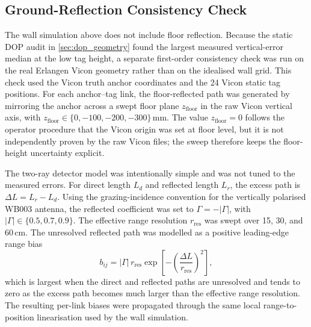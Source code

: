 \documentclass[11pt,a4paper]{article}
\begin{document}
\subsection{Ground-Reflection Consistency Check}
\label{sec:ground_reflection_check}

The wall simulation above does not include floor reflection.
Because the static DOP audit in \cref{sec:dop_geometry} found the largest measured vertical-error median at the low tag height, a separate first-order consistency check was run on the real Erlangen Vicon geometry rather than on the idealised wall grid.
This check used the Vicon truth anchor coordinates and the 24 Vicon static tag positions.
For each anchor--tag link, the floor-reflected path was generated by mirroring the anchor across a swept floor plane $z_{\mathrm{floor}}$ in the raw Vicon vertical axis, with $z_{\mathrm{floor}}\in\{0,-100,-200,-300\}$\,mm.
The value $z_{\mathrm{floor}}=0$ follows the operator procedure that the Vicon origin was set at floor level, but it is not independently proven by the raw Vicon files; the sweep therefore keeps the floor-height uncertainty explicit.

The two-ray detector model was intentionally simple and was not tuned to the measured errors.
For direct length $L_d$ and reflected length $L_r$, the excess path is $\Delta L=L_r-L_d$.
Using the grazing-incidence convention for the vertically polarised WB003 antenna, the reflected coefficient was set to $\Gamma=-|\Gamma|$, with $|\Gamma|\in\{0.5,0.7,0.9\}$.
The effective range resolution $r_{\mathrm{res}}$ was swept over 15, 30, and 60\,cm.
The unresolved reflected path was modelled as a positive leading-edge range bias
\[
  b_{ij}=|\Gamma|\,r_{\mathrm{res}}
  \exp\!\left[-\left(\frac{\Delta L}{r_{\mathrm{res}}}\right)^2\right],
\]
which is largest when the direct and reflected paths are unresolved and tends to zero as the excess path becomes much larger than the effective range resolution.
The resulting per-link biases were propagated through the same local range-to-position linearisation used by the wall simulation.
\end{document}
